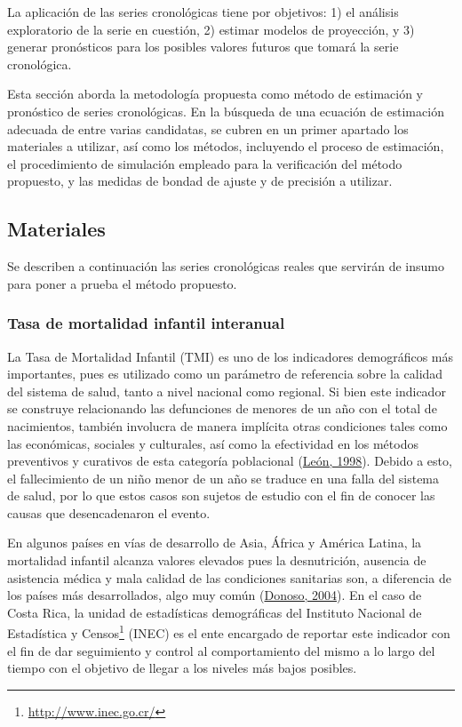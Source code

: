 \documentclass[
]{article}
\begin{document}
La aplicación de las series cronológicas tiene por objetivos: 1) el
análisis exploratorio de la serie en cuestión, 2) estimar modelos de
proyección, y 3) generar pronósticos para los posibles valores futuros
que tomará la serie cronológica.

Esta sección aborda la metodología propuesta como método de estimación y
pronóstico de series cronológicas. En la búsqueda de una ecuación de
estimación adecuada de entre varias candidatas, se cubren en un primer
apartado los materiales a utilizar, así como los métodos, incluyendo el
proceso de estimación, el procedimiento de simulación empleado para la
verificación del método propuesto, y las medidas de bondad de ajuste y
de precisión a utilizar.

\subsection{Materiales}

Se describen a continuación las series cronológicas reales que servirán
de insumo para poner a prueba el método propuesto.

\subsubsection{Tasa de mortalidad infantil interanual}

La Tasa de Mortalidad Infantil (TMI) es uno de los indicadores
demográficos más importantes, pues es utilizado como un parámetro de
referencia sobre la calidad del sistema de salud, tanto a nivel nacional
como regional. Si bien este indicador se construye relacionando las
defunciones de menores de un año con el total de nacimientos, también
involucra de manera implícita otras condiciones tales como las
económicas, sociales y culturales, así como la efectividad en los
métodos preventivos y curativos de esta categoría poblacional
(\protect\hyperlink{ref-leon}{León, 1998}). Debido a esto, el
fallecimiento de un niño menor de un año se traduce en una falla del
sistema de salud, por lo que estos casos son sujetos de estudio con el
fin de conocer las causas que desencadenaron el evento.

En algunos países en vías de desarrollo de Asia, África y América
Latina, la mortalidad infantil alcanza valores elevados pues la
desnutrición, ausencia de asistencia médica y mala calidad de las
condiciones sanitarias son, a diferencia de los países más
desarrollados, algo muy común (\protect\hyperlink{ref-donoso}{Donoso,
2004}). En el caso de Costa Rica, la unidad de estadísticas demográficas
del Instituto Nacional de Estadística y Censos\footnote{\url{http://www.inec.go.cr/}}
(INEC) es el ente encargado de reportar este indicador con el fin de dar
seguimiento y control al comportamiento del mismo a lo largo del tiempo
con el objetivo de llegar a los niveles más bajos posibles.
\end{document}
